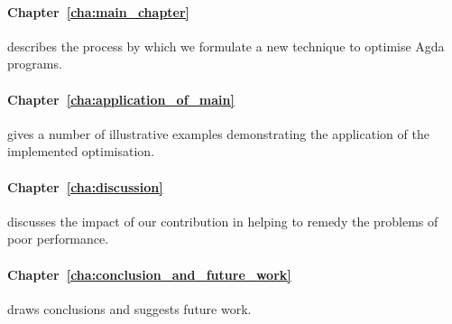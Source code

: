 
\paragraph{Chapter~\ref{cha:main_chapter}} describes the process by which we formulate a new technique to optimise Agda programs.

\paragraph{Chapter~\ref{cha:application_of_main}} gives a number of illustrative examples demonstrating the application of the implemented optimisation.


\paragraph{Chapter~\ref{cha:discussion}} discusses the impact of our contribution in helping to remedy the problems of poor performance.

\paragraph{Chapter~\ref{cha:conclusion_and_future_work}} draws conclusions and suggests future work.
